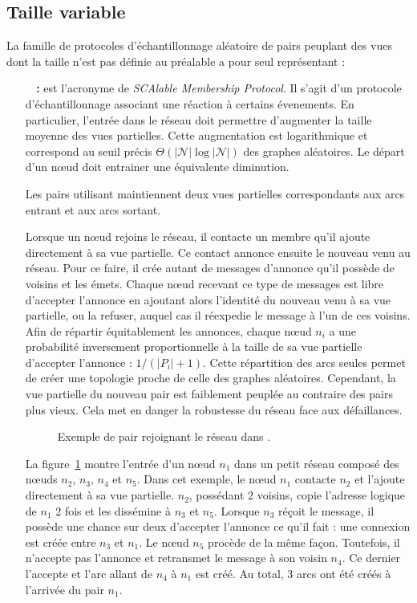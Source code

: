 \subsection{Taille variable}
\label{net:subsec:variable}

La famille de protocoles d'échantillonnage aléatoire de pairs peuplant des vues
dont la taille n'est pas définie au préalable a pour seul représentant :

\begin{itemize}
\item [\textbf{\SCAMP~\cite{ganesh2001scamp, ganesh2003peer} :}] est l'acronyme
  de \emph{SCAlable Membership Protocol}. Il s'agit d'un protocole
  d'échantillonnage associant une réaction à certains évenements. En
  particulier, l'entrée dans le réseau doit permettre d'augmenter la taille
  moyenne des vues partielles. Cette augmentation est logarithmique et
  correspond au seuil précis $\Theta (|\mathcal{N}|\log |\mathcal{N}|)$ des
  graphes aléatoires. Le départ d'un nœud doit entrainer une équivalente
  diminution.

  Les pairs utilisant \SCAMP maintiennent deux vues partielles correspondants
  aux arcs entrant et aux arcs sortant.

  Lorsque un nœud rejoins le réseau, il contacte un membre qu'il ajoute
  directement à sa vue partielle. Ce contact annonce ensuite le nouveau venu au
  réseau. Pour ce faire, il crée autant de messages d'annonce qu'il possède de
  voisins et les émets. Chaque nœud recevant ce type de messages est libre
  d'accepter l'annonce en ajoutant alors l'identité du nouveau venu à sa vue
  partielle, ou la refuser, auquel cas il réexpedie le message à l'un de ces
  voisins. Afin de répartir équitablement les annonces, chaque nœud $n_i$ a une
  probabilité inversement proportionnelle à la taille de sa vue partielle
  d'accepter l'annonce : $1/(|P_i|+1)$. Cette répartition des arcs seules permet
  de créer une topologie proche de celle des graphes aléatoires. Cependant, la
  vue partielle du nouveau pair est faiblement peuplée au contraire des pairs
  plus vieux. Cela met en danger la robustesse du réseau face aux défaillances.

  \begin{figure}
    \centering
    
    \caption{\label{net:fig:scampexample} Exemple de pair rejoignant le réseau
      dans \SCAMP.}
  \end{figure}

  La figure~\ref{net:fig:scampexample} montre l'entrée d'un nœud $n_1$ dans un
  petit réseau \SCAMP composé des nœuds $n_2$, $n_3$, $n_4$ et $n_5$. Dans cet
  exemple, le nœud $n_1$ contacte $n_2$ et l'ajoute directement à sa vue
  partielle. $n_2$, possédant 2 voisins, copie l'adresse logique de $n_1$ 2 fois
  et les dissémine à $n_3$ et $n_5$. Lorsque $n_3$ réçoit le message, il possède
  une chance sur deux d'accepter l'annonce ce qu'il fait : une connexion est
  créée entre $n_3$ et $n_1$. Le nœud $n_5$ procède de la même façon. Toutefois,
  il n'accepte pas l'annonce et retransmet le message à son voisin $n_4$. Ce
  dernier l'accepte et l'arc allant de $n_4$ à $n_1$ est créé. Au total, 3 arcs
  ont été créés à l'arrivée du pair $n_1$.



\end{itemize}
